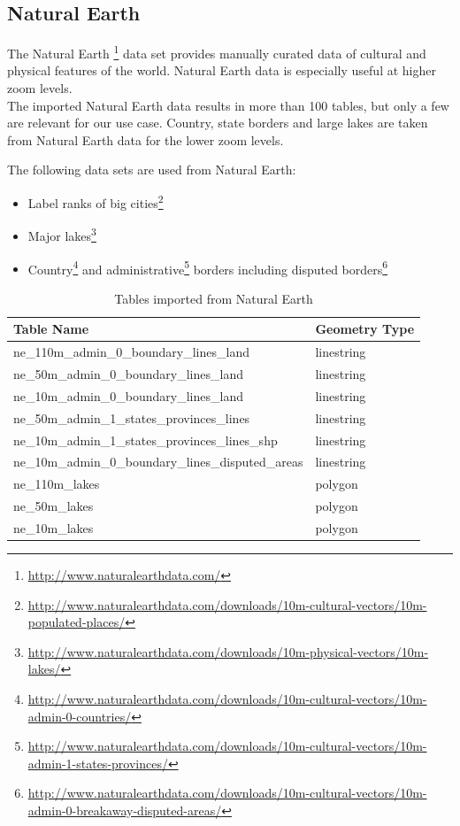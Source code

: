 \newpage
\subsection{Natural Earth}

The Natural Earth \footnote{\url{http://www.naturalearthdata.com/}} data set provides manually curated data of cultural and physical features of the world. Natural Earth data is especially useful at higher zoom levels.
\\
The imported Natural Earth data results in more than 100 tables, but only a few
are relevant for our use case. Country, state borders and large lakes are taken from Natural Earth data for the lower zoom levels.

The following data sets are used from Natural Earth:

\begin{itemize}
\item Label ranks of big cities\footnote{\url{http://www.naturalearthdata.com/downloads/10m-cultural-vectors/10m-populated-places/}}
\item Major lakes\footnote{\url{http://www.naturalearthdata.com/downloads/10m-physical-vectors/10m-lakes/}}
\item Country\footnote{\url{http://www.naturalearthdata.com/downloads/10m-cultural-vectors/10m-admin-0-countries/}} and administrative\footnote{\url{http://www.naturalearthdata.com/downloads/10m-cultural-vectors/10m-admin-1-states-provinces/}} borders including disputed borders\footnote{\url{http://www.naturalearthdata.com/downloads/10m-cultural-vectors/10m-admin-0-breakaway-disputed-areas/}}
\end{itemize}



\begin{table}[H]
\centering
    \begin{tabular}{ll}
    \hline
    Table Name                                          & Geometry Type \\
    \hline
    ne\_110m\_admin\_0\_boundary\_lines\_land           & linestring    \\
    ne\_50m\_admin\_0\_boundary\_lines\_land            & linestring    \\
    ne\_10m\_admin\_0\_boundary\_lines\_land            & linestring    \\
    ne\_50m\_admin\_1\_states\_provinces\_lines         & linestring    \\
    ne\_10m\_admin\_1\_states\_provinces\_lines\_shp    & linestring    \\
    ne\_10m\_admin\_0\_boundary\_lines\_disputed\_areas & linestring    \\
    ne\_110m\_lakes                                     & polygon       \\
    ne\_50m\_lakes                                      & polygon       \\
    ne\_10m\_lakes                                      & polygon       \\
    \end{tabular}
    \caption{Tables imported from Natural Earth}
\end{table}

